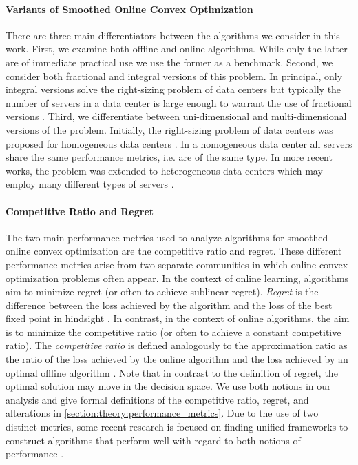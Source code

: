 \paragraph{Variants of Smoothed Online Convex Optimization} There are three main differentiators between the algorithms we consider in this work. First, we examine both offline and online algorithms. While only the latter are of immediate practical use we use the former as a benchmark. Second, we consider both fractional and integral versions of this problem. In principal, only integral versions solve the right-sizing problem of data centers but typically the number of servers in a data center is large enough to warrant the use of fractional versions \cite{Bansal2015}. Third, we differentiate between uni-dimensional and multi-dimensional versions of the problem. Initially, the right-sizing problem of data centers was proposed for homogeneous data centers \cite{Lin2011, Bansal2015, Albers2018}. In a homogeneous data center all servers share the same performance metrics, i.e. are of the same type. In more recent works, the problem was extended to heterogeneous data centers which may employ many different types of servers \cite{Lin2012, Chen2018, Goel2019, Albers2021, Albers2021_2}.

\paragraph{Competitive Ratio and Regret} The two main performance metrics used to analyze algorithms for smoothed online convex optimization are the competitive ratio and regret. These different performance metrics arise from two separate communities in which online convex optimization problems often appear. In the context of online learning, algorithms aim to minimize regret (or often to achieve sublinear regret). \textit{Regret} is the difference between the loss achieved by the algorithm and the loss of the best fixed point in hindsight \cite{Chen2018}. In contrast, in the context of online algorithms, the aim is to minimize the competitive ratio (or often to achieve a constant competitive ratio). The \textit{competitive ratio} is defined analogously to the approximation ratio as the ratio of the loss achieved by the online algorithm and the loss achieved by an optimal offline algorithm \cite{Chen2018}. Note that in contrast to the definition of regret, the optimal solution may move in the decision space. We use both notions in our analysis and give formal definitions of the competitive ratio, regret, and alterations in \autoref{section:theory:performance_metrics}. Due to the use of two distinct metrics, some recent research is focused on finding unified frameworks to construct algorithms that perform well with regard to both notions of performance \cite{Chen2018, Goel2019}.


